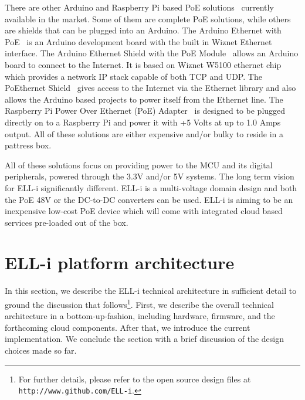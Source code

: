 \documentclass{siamltex}
\begin{document}
There are other Arduino and Raspberry Pi based PoE
solutions~\cite{ArduinoEthernetPOE, ArduinoEthernetShieldPOE,
  etherduino, POEthernetShield, xtronix} currently available in
the market.  Some of them are complete PoE solutions, while others are shields
that can be plugged into an Arduino.  The Arduino Ethernet with
PoE~\cite{ArduinoEthernetPOE} is an Arduino development board with the built in
Wiznet Ethernet interface. 
The Arduino Ethernet Shield
with the PoE Module~\cite{ArduinoEthernetShieldPOE} allows an Arduino board to
connect to the Internet. It is based on Wiznet W5100 ethernet chip which
provides a network IP stack capable of both TCP and UDP. The PoEthernet
Shield~\cite{POEthernetShield} gives access to the Internet via the Ethernet
library and also allows the Arduino based projects to power itself from the
Ethernet line. The Raspberry Pi Power Over Ethernet (PoE) Adapter~\cite{xtronix}
is designed to be plugged directly on to a
Raspberry Pi and power it with +5 Volts at up to 1.0 Amps output. All of these
solutions are either expensive and/or bulky to reside in a pattress box.

All of these solutions focus on providing power to the MCU and its digital peripherals, powered through the 3.3V and/or 5V systems.
The long term vision for ELL-i significantly different.  
ELL-i is a multi-voltage domain design and
both the PoE 48V or the DC-to-DC converters can be used. ELL-i is aiming to be
an inexpensive low-cost PoE device which will come with integrated cloud based
services pre-loaded out of the box. 


\section{ELL-i platform architecture}
\label{sec:architecture}

In this section, we describe the ELL-i technical architecture in
sufficient detail to ground the discussion that follows\footnote{For further
details, please refer to the open source design files at
\hbox{\tt http://www.github.com/ELL-i}.}.
First, we describe the overall technical architecture in a
bottom-up-fashion, including hardware, firmware, and the forthcoming
cloud components.  After that, we introduce the current
implementation.
We
conclude the section with a brief discussion of the design choices
made so far.
\end{document}
